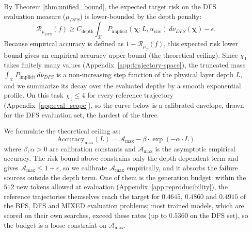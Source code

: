 By Theorem \ref{thm:unified_bound}, the expected target risk on the DFS evaluation measure ($\mu_{DFS}$) is lower-bounded by the depth penalty: 
\begin{equation}
\mathcal{R}_{\mu_{DFS}}(f) \ge C_{\mathrm{depth}} \int_{\mathcal{X}} P_{\mathrm{implicit}}(\boldsymbol{\chi}; L, \alpha_{\mathrm{circ}}) \, d\nu_{DFS}(\boldsymbol{\chi}) - \epsilon.
\end{equation}
Because empirical accuracy is defined as $1 - \mathcal{R}_{\mu_T}(f)$, this expected risk lower bound gives an empirical accuracy upper bound (the theoretical ceiling). Since $\chi_1$ takes finitely many values (Appendix~\ref{app:trajectory-space}), the truncated mass $\int_{\mathcal{X}} P_{\mathrm{implicit}}\,d\nu_{DFS}$ is a non-increasing step function of the physical layer depth $L$, and we summarize its decay over the evaluated depths by a smooth exponential profile. On this task $\chi_1\le 4$ for every reference trajectory (Appendix~\ref{app:eval_scope}), so the curve below is a calibrated envelope, drawn for the DFS evaluation set, the hardest of the three.

We formulate the theoretical ceiling as:
\begin{equation}
    \text{Accuracy}_{\max}(L) = \mathcal{A}_{\max} - \beta \cdot \exp(-\alpha \cdot L)
\end{equation}
where $\beta, \alpha > 0$ are calibration constants and $\mathcal{A}_{\max}$ is the asymptotic empirical accuracy. The risk bound above constrains only the depth-dependent term and gives $\mathcal{A}_{\max}\le 1+\epsilon$, so we calibrate $\mathcal{A}_{\max}$ empirically, and it absorbs the failure sources outside the depth term. One of them is the generation budget: within the $512$ new tokens allowed at evaluation (Appendix~\ref{app:reproducibility}), the reference trajectories themselves reach the target for $0.4645$, $0.4860$ and $0.4915$ of the BFS, DFS and MIXED evaluation problems; most trained models, which are scored on their own searches, exceed these rates (up to $0.5360$ on the DFS set), so the budget is a loose constraint on $\mathcal{A}_{\max}$.

